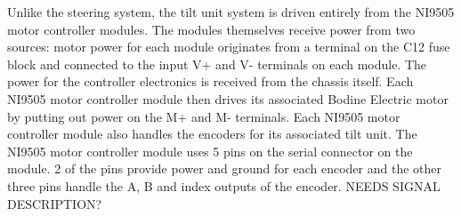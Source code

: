 \noindent Unlike the steering system, the tilt unit system is driven entirely from the NI9505 motor controller modules. The modules themselves receive power from two sources: motor power for each module originates from a terminal on the C12 fuse block and connected to the input V+ and V- terminals on each module. The power for the controller electronics is received from the chassis itself. Each NI9505 motor controller module then drives its associated Bodine Electric motor by putting out power on the M+ and M- terminals. Each NI9505 motor controller module also handles the encoders for its associated tilt unit. The NI9505 motor controller module uses 5 pins on the serial connector on the module. 2 of the pins provide power and ground for each encoder and the other three pins handle the A, B and index outputs of the encoder. NEEDS SIGNAL DESCRIPTION?

 
